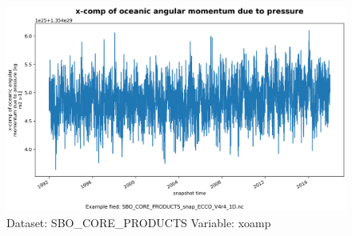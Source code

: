 \begin{figure}[H]
\centering
\includegraphics[scale=0.55]{../images/plots/oneD_plots/SBO_Core_Products/xoamp.png}
\caption{Dataset: SBO\_CORE\_PRODUCTS Variable: xoamp}
\label{tab:table-SBO_CORE_PRODUCTS_xoamp-Plot}
\end{figure}
\pagebreak
